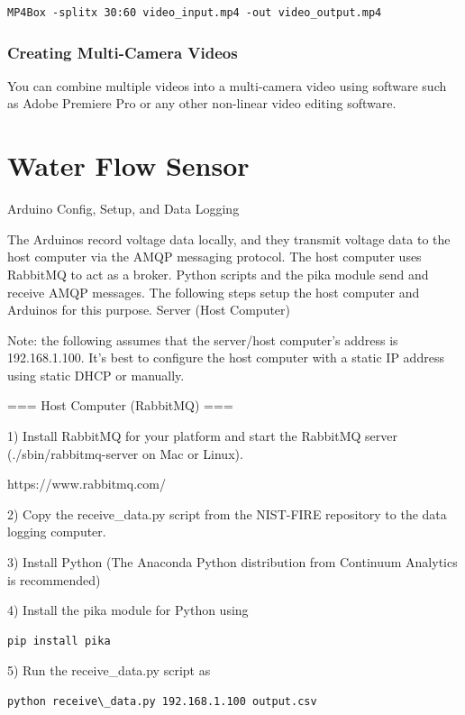 \documentclass[11pt,oneside]{book}
\begin{document}
\begin{verbatim}
MP4Box -splitx 30:60 video_input.mp4 -out video_output.mp4
\end{verbatim}

\subsection{Creating Multi-Camera Videos}

You can combine multiple videos into a multi-camera video using software such as Adobe Premiere Pro or any other non-linear video editing software.


\chapter{Water Flow Sensor}
\label{chap:Water_Flow_Sensor}

Arduino Config, Setup, and Data Logging

The Arduinos record voltage data locally, and they transmit voltage data to the host computer via the AMQP messaging protocol. The host computer uses RabbitMQ to act as a broker. Python scripts and the pika module send and receive AMQP messages. The following steps setup the host computer and Arduinos for this purpose.
Server (Host Computer)

Note: the following assumes that the server/host computer’s address is 192.168.1.100. It’s best to configure the host computer with a static IP address using static DHCP or manually.


=== Host Computer (RabbitMQ) ===

1) Install RabbitMQ for your platform and start the RabbitMQ server (./sbin/rabbitmq-server on Mac or Linux).

https://www.rabbitmq.com/

2) Copy the receive\_data.py script from the NIST-FIRE repository to the data logging computer.

3) Install Python (The Anaconda Python distribution from Continuum Analytics is recommended)

4) Install the pika module for Python using

\begin{verbatim}
pip install pika
\end{verbatim}

5) Run the receive\_data.py script as

\begin{verbatim}
python receive\_data.py 192.168.1.100 output.csv
\end{verbatim}
\end{document}
